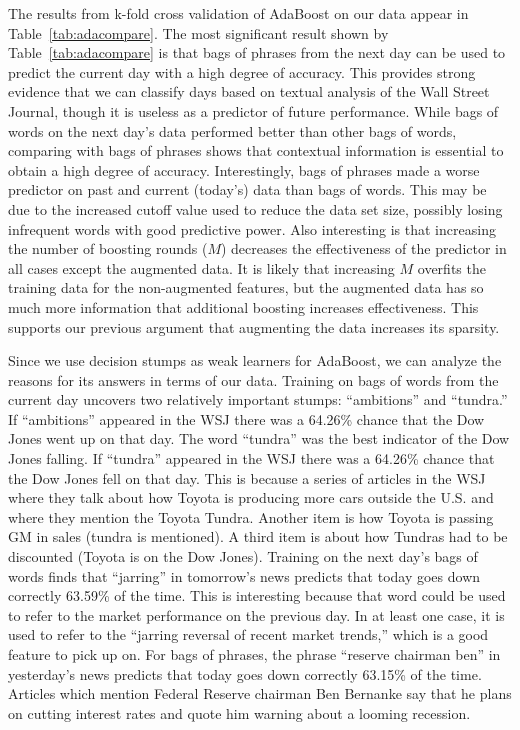 \documentclass[10pt, twocolumn]{article}
\begin{document}
The results from k-fold cross validation of AdaBoost on our data appear in Table~\ref{tab:adacompare}. The most significant result shown by Table~\ref{tab:adacompare} is that bags of phrases from the next day can be used to predict the current day with a high degree of accuracy. This provides strong evidence that we can classify days based on textual analysis of the Wall Street Journal, though it is useless as a predictor of future performance. While bags of words on the next day's data performed better than other bags of words, comparing with bags of phrases shows that contextual information is essential to obtain a high degree of accuracy. Interestingly, bags of phrases made a worse predictor on past and current (today's) data than bags of words. This may be due to the increased cutoff value used to reduce the data set size, possibly losing infrequent words with good predictive power. Also interesting is that increasing the number of boosting rounds ($M$) decreases the effectiveness of the predictor in all cases except the augmented data. It is likely that increasing $M$ overfits the training data for the non-augmented features, but the augmented data has so much more information that additional boosting increases effectiveness. This supports our previous argument that augmenting the data increases its sparsity.

Since we use decision stumps as weak learners for AdaBoost, we can analyze the reasons for its answers in terms of our data. Training on bags of words from the current day uncovers two relatively important stumps: ``ambitions'' and ``tundra.'' If ``ambitions'' appeared in the WSJ there was a 64.26\% chance that the Dow Jones went up on that day.  The word ``tundra'' was the best indicator of the Dow Jones falling. If ``tundra'' appeared in the WSJ there was a 64.26\% chance that the Dow Jones fell on that day. This is because a series of articles in the WSJ where they talk about how Toyota is producing more cars outside the U.S. and where they mention the Toyota Tundra. Another item is how Toyota is passing GM in sales (tundra is mentioned). A third item is about how Tundras had to be discounted (Toyota is on the Dow Jones). Training on the next day's bags of words finds that ``jarring'' in tomorrow's news predicts that today goes down correctly 63.59\% of the time. This is interesting because that word could be used to refer to the market performance on the previous day. In at least one case, it is used to refer to the ``jarring reversal of recent market trends,'' which is a good feature to pick up on. For bags of phrases, the phrase ``reserve chairman ben'' in yesterday's news predicts that today goes down correctly 63.15\% of the time. Articles which mention Federal Reserve chairman Ben Bernanke say that he plans on cutting interest rates and quote him warning about a looming recession.
\end{document}
